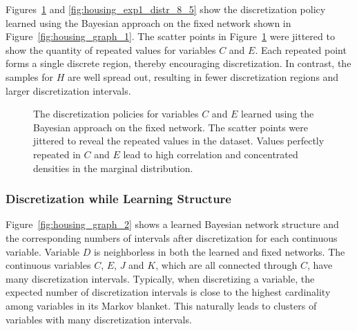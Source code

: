 \documentclass[twoside,11pt]{article}
\newcommand{\todo}[1]{\textcolor{magenta}{#1}}
\begin{document}
\begin{table}
  \centering
  \caption{
    Discretization policy summary of the Housing dataset based on the fixed network structure shown.
    The first twelve rows show the numbers of discretization intervals and the last row is the mean cross-validated log-likelihood.%
  }
  
  \label{table:housing_disc_table_1}
\end{table}

Figures~\ref{fig:housing_exp1_distr_3_5} and \ref{fig:housing_exp1_distr_8_5} show the discretization policy learned using the Bayesian approach on the fixed network shown in Figure~\ref{fig:housing_graph_1}.
The scatter points in Figure~\ref{fig:housing_exp1_distr_3_5} were jittered to show the quantity of repeated values for variables $C$ and $E$.
Each repeated point forms a single discrete region, thereby encouraging discretization.
In contrast, the samples for $H$ are well spread out, resulting in fewer discretization regions and larger discretization intervals.

\begin{figure}[ht]
  \centering
  
  \caption{
    The discretization policies for variables $C$ and $E$ learned using the Bayesian approach on the fixed network.
    The scatter points were jittered to reveal the repeated values in the dataset.
    Values perfectly repeated in $C$ and $E$ lead to high correlation and concentrated densities in the marginal distribution.
  }
  \label{fig:housing_exp1_distr_3_5}
\end{figure}

\subsubsection{Discretization while Learning Structure}
\label{subsubsec:housing_exp2}

Figure~\ref{fig:housing_graph_2} shows a learned Bayesian network structure and the corresponding numbers of intervals after discretization for each continuous variable.
Variable $D$ is neighborless in both the learned and fixed networks.
The continuous variables $C$, $E$, $J$ and $K$, which are all connected through $C$, have many discretization intervals.
Typically, when discretizing a variable, the expected number of discretization intervals is close to the highest cardinality among variables in its Markov blanket.
This naturally leads to clusters of variables with many discretization intervals.
\end{document}
